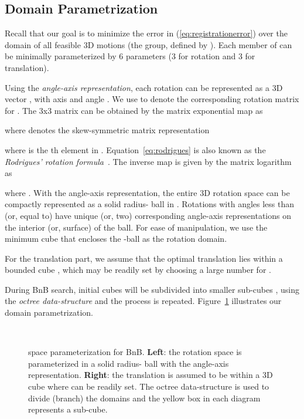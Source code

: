 \documentclass[10pt,journal,cspaper,compsoc]{IEEEtran}
\begin{document}
\subsection{Domain Parametrization}\label{sec:domain}
Recall that our goal is to minimize the error  in (\ref{eq:registrationerror}) over the domain of all feasible 3D motions (the  group, defined by ). Each member of  can be minimally parameterized by 6 parameters (3 for rotation and 3 for translation).

Using the \emph{angle-axis representation}, each rotation can be represented as a 3D vector , with axis  and angle . We use  to denote the corresponding rotation matrix for . The 3x3 matrix  can be obtained by the matrix exponential map as

\noindent where  denotes the skew-symmetric matrix representation

\noindent where  is the th element in . Equation~\ref{eq:rodrigues} is also known as the \emph{Rodrigues' rotation formula}~\cite{hartley2004}. The inverse map is given by the matrix logarithm as

\noindent where .
With the angle-axis representation, the entire 3D rotation space can be compactly represented as a solid radius- ball in . Rotations with angles less than (or, equal to)  have unique (or, two) corresponding angle-axis representations on the interior (or, surface) of the ball. For ease of manipulation, we use the minimum cube  that encloses the -ball as the rotation domain.

For the translation part, we assume that the optimal translation lies within a bounded cube , which may be readily set by choosing a large number for .

During BnB search, initial cubes will be subdivided into smaller sub-cubes ,  using the \emph{octree data-structure} and the process is repeated. Figure~\ref{fig:domain} illustrates our domain parametrization.

\begin{figure}[!t]
\begin{center}
\ \ \ \ \ \ \ \
\vspace{-2pt}
\caption{ space parameterization for BnB. \textbf{Left}: the rotation space  is parameterized in a solid radius- ball with the angle-axis representation. \textbf{Right}: the translation is assumed to be within a 3D cube  where  can be readily set. The octree data-structure is used to divide (branch) the domains and the yellow box in each diagram represents a sub-cube.}\label{fig:domain}
\end{center}
\vspace{-6pt}
\end{figure}
\end{document}
